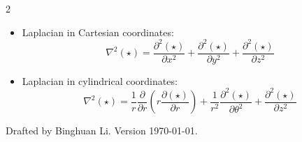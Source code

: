 \documentclass[10pt, a4paper, table]{article}
\begin{document}
\begin{mdframed} \vspace{-.5cm}
\begin{multicols}{2}
\begin{itemize}
    \item Laplacian in Cartesian coordinates:
    \[
        \nabla^2 (\star)
        =
        \frac{\partial^2 (\star)}{\partial x^2}
        +
        \frac{\partial^2 (\star)}{\partial y^2}
        +
        \frac{\partial^2 (\star)}{\partial z^2}
    \]

    \item Laplacian in cylindrical coordinates:
    \[
        \nabla^2 (\star)
        =
        \frac{1}{r}\frac{\partial}{\partial r}
        \left(
        r\frac{\partial (\star)}{\partial r}
        \right)
        +
        \frac{1}{r^2}
        \frac{\partial^2 (\star)}{\partial \theta^2}
        +
        \frac{\partial^2 (\star)}{\partial z^2}
    \]
\end{itemize}
    
\end{multicols}
\end{mdframed}



{
\footnotesize \color{gray} Drafted by Binghuan Li. Version \today.
}
\end{document}
